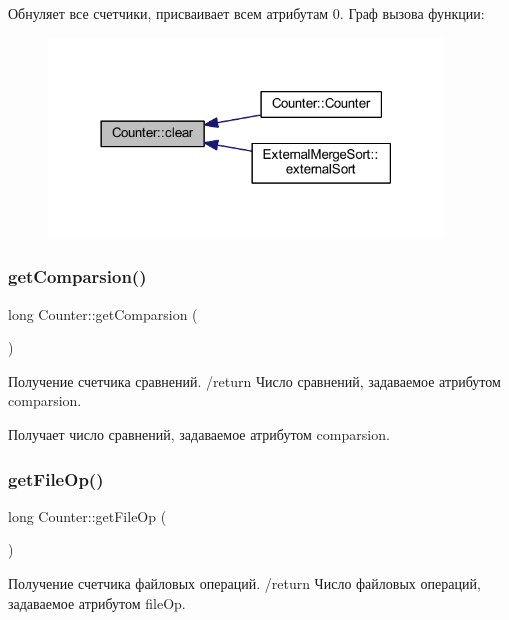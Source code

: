 Обнуляет все счетчики, присваивает всем атрибутам 0. Граф вызова функции\+:\nopagebreak
\begin{figure}[H]
\begin{center}
\leavevmode
\includegraphics[width=297pt]{class_counter_af66c74ac2bc69fa4f30c34377f869596_icgraph}
\end{center}
\end{figure}
\hypertarget{class_counter_a273aaa4592ef5fae6b7a90544d0ff6e0}{}\label{class_counter_a273aaa4592ef5fae6b7a90544d0ff6e0} 
\subsubsection{\texorpdfstring{get\+Comparsion()}{getComparsion()}}
{\footnotesize\ttfamily long Counter\+::get\+Comparsion (\begin{DoxyParamCaption}{ }\end{DoxyParamCaption})}



Получение счетчика сравнений. /return Число сравнений, задаваемое атрибутом comparsion. 

Получает число сравнений, задаваемое атрибутом comparsion. \hypertarget{class_counter_ac0a53b0296d0eacca2a2391a12ae39c5}{}\label{class_counter_ac0a53b0296d0eacca2a2391a12ae39c5} 
\subsubsection{\texorpdfstring{get\+File\+Op()}{getFileOp()}}
{\footnotesize\ttfamily long Counter\+::get\+File\+Op (\begin{DoxyParamCaption}{ }\end{DoxyParamCaption})}



Получение счетчика файловых операций. /return Число файловых операций, задаваемое атрибутом file\+Op. 

